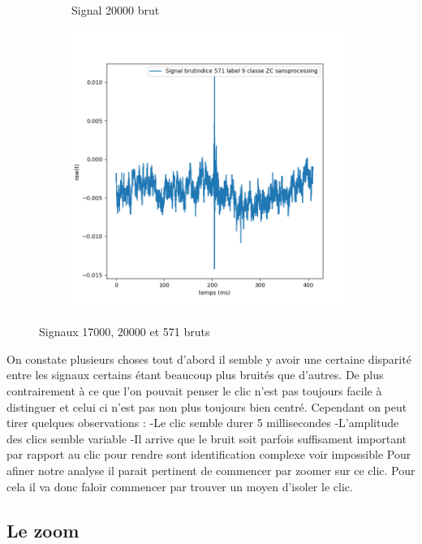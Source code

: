 \begin{figure}[!h]
\begin{subfigure}[b]{0.3\textwidth}
    \caption{Signal 20000 brut}
  \end{subfigure}
  \begin{subfigure}[b]{0.3\textwidth}
    \includegraphics[width=\textwidth]{./images/indice571Spectro1Dlabel9classeZCsansprocessingsanszoom.png}
  \end{subfigure}
  \caption{Signaux 17000, 20000 et 571 bruts}
\end{figure}

On constate plusieurs choses tout d'abord il semble y avoir une certaine disparité entre les signaux certains étant beaucoup plus bruités que d'autres. De plus contrairement à ce que l'on pouvait penser le clic n'est pas toujours facile à distinguer et celui ci n'est pas non plus toujours bien centré.
Cependant on peut tirer quelques observations :
-Le clic semble durer 5 millisecondes
-L'amplitude des clics semble variable
-Il arrive que le bruit soit parfois suffisament important par rapport au clic pour rendre sont identification complexe voir impossible
Pour afiner notre analyse il parait pertinent de commencer par zoomer sur ce clic.
Pour cela il va donc faloir commencer par trouver un moyen d'isoler le clic.

\hypertarget{Le-zoom}{%
\subsection{Le zoom}
\label{Le-zoom}}


